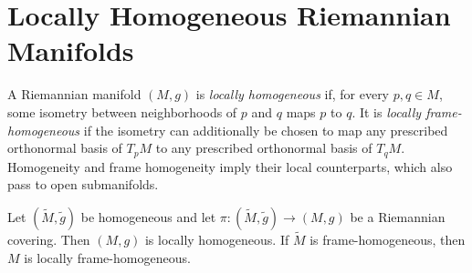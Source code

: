 \section{Locally Homogeneous Riemannian Manifolds}

A Riemannian manifold $(M,g)$ is \emph{locally homogeneous} if, for every
$p,q\in M$, some isometry between neighborhoods of $p$ and $q$ maps $p$ to
$q$. It is \emph{locally frame-homogeneous} if the isometry can additionally be
chosen to map any prescribed orthonormal basis of $T_pM$ to any prescribed
orthonormal basis of $T_qM$. Homogeneity and frame homogeneity imply their local
counterparts, which also pass to open submanifolds.

\begin{proposition}
\label{prop:covering-locally-homogeneous}
Let $(\widetilde M,\widetilde g)$ be homogeneous and let
$\pi\colon(\widetilde M,\widetilde g)\to(M,g)$ be a Riemannian covering. Then
$(M,g)$ is locally homogeneous. If $\widetilde M$ is frame-homogeneous, then
$M$ is locally frame-homogeneous.
\end{proposition}

